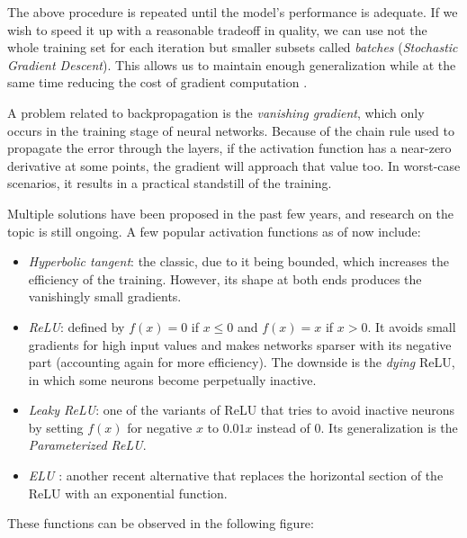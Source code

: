     The above procedure is repeated until the model's performance is adequate. If we wish to speed it up with a reasonable tradeoff in quality, we can use not the whole training set for each iteration but smaller subsets called \textit{batches} (\textit{Stochastic Gradient Descent}). This allows us to maintain enough generalization while at the same time reducing the cost of gradient computation \cite{lecun-dl}.

    A problem related to backpropagation is the \textit{vanishing gradient}, which only occurs in the training stage of neural networks. Because of the chain rule used to propagate the error through the layers, if the activation function has a near-zero derivative at some points, the gradient will approach that value too. In worst-case scenarios, it results in a practical standstill of the training.

    Multiple solutions have been proposed in the past few years, and research on the topic is still ongoing. A few popular activation functions as of now include:

    \begin{itemize}

    	\item
    	\textit{Hyperbolic tangent}: the classic, due to it being bounded, which increases the efficiency of the training. However, its shape at both ends produces the vanishingly small gradients.

    	\item
    	\textit{\ac{ReLU}}: defined by $f(x) = 0$ if $x \leq 0$ and $f(x) = x$ if $x > 0$. It avoids small gradients for high input values and makes networks sparser with its negative part (accounting again for more efficiency). The downside is the \textit{dying} \acs{ReLU}, in which some neurons become perpetually inactive.

    	\item
    	\textit{Leaky \acs{ReLU}}: one of the variants of \acs{ReLU} that tries to avoid inactive neurons by setting $f(x)$ for negative $x$ to $0.01x$ instead of $0$. Its generalization is the \textit{Parameterized ReLU}.

    	\item
    	\textit{\ac{ELU}} \cite{elu}: another recent alternative that replaces the horizontal section of the \acs{ReLU} with an exponential function.

    \end{itemize}

    These functions can be observed in the following figure:

